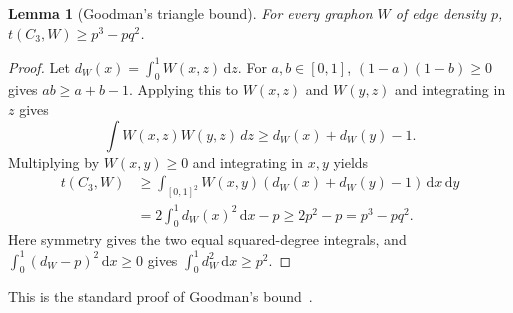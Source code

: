 \documentclass[11pt]{article}
\numberwithin{equation}{section}
\newtheorem{lemma}[theorem]{Lemma}
\newcommand{\dd}{\,\mathrm d}
\begin{document}
\begin{lemma}[Goodman's triangle bound]\label{lem:triangle}
For every graphon $W$ of edge density $p$,
$t(C_3,W)\ge p^3-pq^2$.
\end{lemma}
\begin{proof}
Let $d_W(x)=\int_0^1 W(x,z)\dd z$. For $a,b\in[0,1]$,
$(1-a)(1-b)\ge0$ gives $ab\ge a+b-1$. Applying this to
$W(x,z)$ and $W(y,z)$ and integrating in $z$ gives
\[
 \int W(x,z)W(y,z)\,dz\ge d_W(x)+d_W(y)-1.
\]
Multiplying by $W(x,y)\ge0$ and integrating in $x,y$ yields
\begin{align*}
 t(C_3,W)
 &\ge\int_{[0,1]^2}W(x,y)(d_W(x)+d_W(y)-1)\dd x\dd y\\
 &=2\int_0^1d_W(x)^2\dd x-p
 \ge2p^2-p=p^3-pq^2.
\end{align*}
Here symmetry gives the two equal squared-degree integrals, and
$\int_0^1(d_W-p)^2\dd x\ge0$ gives
$\int_0^1d_W^2\dd x\ge p^2$.
\end{proof}
This is the standard proof of Goodman's bound~\cite{goodman1959sets}.
\end{document}
